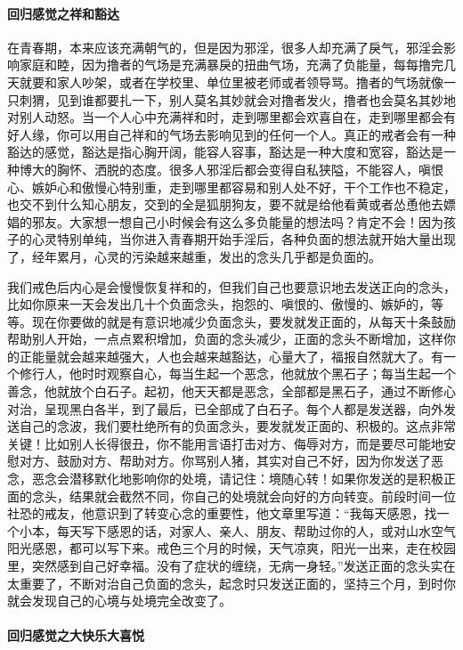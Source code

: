 \paragraph{回归感觉之祥和豁达}

在青春期，本来应该充满朝气的，但是因为邪淫，很多人却充满了戾气，邪淫会影响家庭和睦，因为撸者的气场是充满暴戾的扭曲气场，充满了负能量，每每撸完几天就要和家人吵架，或者在学校里、单位里被老师或者领导骂。撸者的气场就像一只刺猬，见到谁都要扎一下，别人莫名其妙就会对撸者发火，撸者也会莫名其妙地对别人动怒。当一个人心中充满祥和时，走到哪里都会欢喜自在，走到哪里都会有好人缘，你可以用自己祥和的气场去影响见到的任何一个人。真正的戒者会有一种豁达的感觉，豁达是指心胸开阔，能容人容事，豁达是一种大度和宽容，豁达是一种博大的胸怀、洒脱的态度。很多人邪淫后都会变得自私狭隘，不能容人，嗔恨心、嫉妒心和傲慢心特别重，走到哪里都容易和别人处不好，干个工作也不稳定，也交不到什么知心朋友，交到的全是狐朋狗友，要不就是给他看黄或者怂恿他去嫖娼的邪友。大家想一想自己小时候会有这么多负能量的想法吗？肯定不会！因为孩子的心灵特别单纯，当你进入青春期开始手淫后，各种负面的想法就开始大量出现了，经年累月，心灵的污染越来越重，发出的念头几乎都是负面的。

我们戒色后内心是会慢慢恢复祥和的，但我们自己也要意识地去发送正向的念头，比如你原来一天会发出几十个负面念头，抱怨的、嗔恨的、傲慢的、嫉妒的，等等。现在你要做的就是有意识地减少负面念头，要发就发正面的，从每天十条鼓励帮助别人开始，一点点累积增加，负面的念头减少，正面的念头不断增加，这样你的正能量就会越来越强大，人也会越来越豁达，心量大了，福报自然就大了。有一个修行人，他时时观察自心，每当生起一个恶念，他就放个黑石子；每当生起一个善念，他就放个白石子。起初，他天天都是恶念，全部都是黑石子，通过不断修心对治，呈现黑白各半，到了最后，已全部成了白石子。每个人都是发送器，向外发送自己的念波，我们要杜绝所有的负面念头，要发就发正面的、积极的。这点非常关键！比如别人长得很丑，你不能用言语打击对方、侮辱对方，而是要尽可能地安慰对方、鼓励对方、帮助对方。你骂别人猪，其实对自己不好，因为你发送了恶念，恶念会潜移默化地影响你的处境，请记住：境随心转！如果你发送的是积极正面的念头，结果就会截然不同，你自己的处境就会向好的方向转变。前段时间一位社恐的戒友，他意识到了转变心念的重要性，他文章里写道：“我每天感恩，找一个小本，每天写下感恩的话，对家人、亲人、朋友、帮助过你的人，或对山水空气阳光感恩，都可以写下来。戒色三个月的时候，天气凉爽，阳光一出来，走在校园里，突然感到自己好幸福。没有了症状的缠绕，无病一身轻。”发送正面的念头实在太重要了，不断对治自己负面的念头，起念时只发送正面的，坚持三个月，到时你就会发现自己的心境与处境完全改变了。

\paragraph{回归感觉之大快乐大喜悦}

